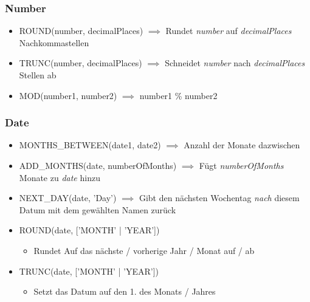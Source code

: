 \subsubsection{Number}
\begin{itemize}
    \item ROUND(number, decimalPlaces) $\implies$ Rundet \textit{number} auf \textit{decimalPlaces} Nachkommastellen
    \item TRUNC(number, decimalPlaces) $\implies$ Schneidet \textit{number} nach \textit{decimalPlaces} Stellen ab
    \item MOD(number1, number2) $\implies$ number1 \% number2
\end{itemize}

\subsubsection{Date}
\begin{itemize}
    \item MONTHS\_BETWEEN(date1, date2) $\implies$ Anzahl der Monate dazwischen
    \item ADD\_MONTHS(date, numberOfMonths) $\implies$ Fügt \textit{numberOfMonths} Monate zu \textit{date} hinzu
    \item NEXT\_DAY(date, 'Day') $\implies$ Gibt den nächsten Wochentag \textit{nach} diesem Datum mit dem gewählten Namen zurück
    \item ROUND(date,  ['MONTH' | 'YEAR'])
    \begin{itemize}
        \item Rundet Auf das nächste / vorherige Jahr / Monat auf / ab
    \end{itemize}
    \item TRUNC(date, ['MONTH' | 'YEAR'])
    \begin{itemize}
        \item Setzt das Datum auf den 1. des Monats / Jahres
    \end{itemize}
\end{itemize}

